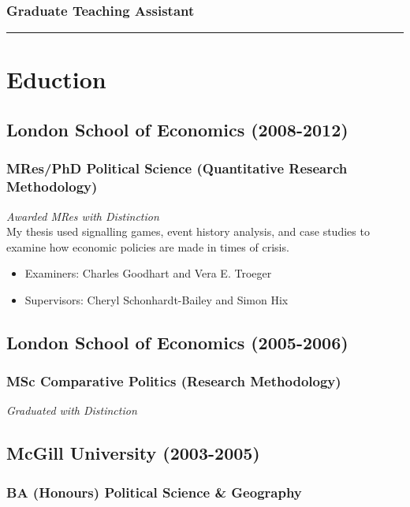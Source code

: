 \documentclass[a4paper]{article}
\begin{document}
{{\subsubsection*{Graduate Teaching Assistant}

\vspace{0.25cm}
\medskip\hrule height 1pt
\vspace{0.5cm}


\section*{Eduction}

\subsection*{London School of Economics (2008-2012)}
\subsubsection*{MRes/PhD Political Science (Quantitative Research Methodology)}

\emph{Awarded MRes with Distinction} \\

\noindent My thesis used signalling games, event history analysis, and case studies to examine how economic policies are made in times of crisis.

\begin{itemize}
    \item Examiners: Charles Goodhart and Vera E. Troeger
    \item Supervisors: Cheryl Schonhardt-Bailey and Simon Hix
\end{itemize}

\subsection*{London School of Economics (2005-2006)}
\subsubsection*{MSc Comparative Politics (Research Methodology)}

{\emph{Graduated with Distinction}}

\subsection*{McGill University (2003-2005)}
\subsubsection*{BA (Honours) Political Science \& Geography}

}}
\end{document}
